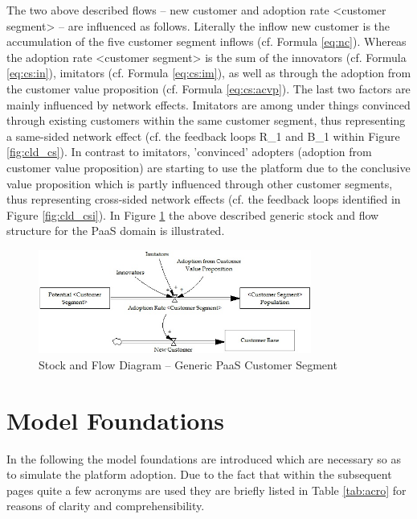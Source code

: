 The two above described flows -- new customer and adoption rate <customer segment>  -- are influenced as follows. Literally the inflow new customer is the accumulation of the five customer segment inflows (cf. Formula \ref{eq:nc}). Whereas the adoption rate <customer segment> is the sum of the innovators (cf. Formula \ref{eq:cs:in}), imitators (cf. Formula \ref{eq:cs:im}), as well as through the adoption from the customer value proposition (cf. Formula \ref{eq:cs:acvp}). The last two factors are mainly influenced by network effects. Imitators are among under things convinced through existing customers within the same customer segment, thus representing a same-sided network effect (cf. the feedback loops R\_1 and B\_1 within Figure \ref{fig:cld_cs}). In contrast to imitators, 'convinced' adopters (adoption from customer value proposition) are starting to use the platform due to the conclusive value proposition which is partly influenced through other customer segments, thus representing cross-sided network effects (cf. the feedback loops identified in Figure \ref{fig:cld_csi}). In Figure \ref{fig:sfd_cs} the above described generic stock and flow structure for the \ac{PaaS} domain is illustrated.

\begin{figure}[tb]
	\centering
	\includegraphics[width=0.8\textwidth]{gfx/sfd_customerSegment}
	\caption{Stock and Flow Diagram -- Generic PaaS Customer Segment}
	\label{fig:sfd_cs}
\end{figure}

\section{Model Foundations}\label{ch:sfd:mf}
In the following the model foundations are introduced which are necessary so as to simulate the platform adoption. Due to the fact that within the subsequent pages quite a few acronyms are used they are briefly listed in Table \ref{tab:acro} for reasons of clarity and comprehensibility.

